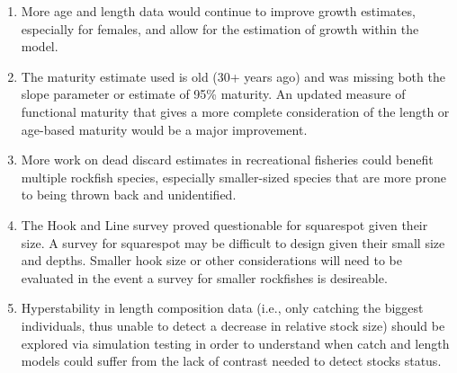 \documentclass[11pt,
  english,
  a4paper,
]{article}
\begin{document}
\begin{enumerate}
\def\labelenumi{\arabic{enumi}.}
\item

  More age and length data would continue to improve growth estimates, especially for females, and allow for the estimation of growth within the model.

  \tagmcend\tagstructend\tagstructend
\item

  The maturity estimate used is old (30+ years ago) and was missing both the slope parameter or estimate of 95\% maturity. An updated measure of functional maturity that gives a more complete consideration of the length or age-based maturity would be a major improvement.

  \tagmcend\tagstructend\tagstructend
\item

  More work on dead discard estimates in recreational fisheries could benefit multiple rockfish species, especially smaller-sized species that are more prone to being thrown back and unidentified.

  \tagmcend\tagstructend\tagstructend
\item

  The Hook and Line survey proved questionable for squarespot given their size. A survey for squarespot may be difficult to design given their small size and depths. Smaller hook size or other considerations will need to be evaluated in the event a survey for smaller rockfishes is desireable.

  \tagmcend\tagstructend\tagstructend
\item

  Hyperstability in length composition data (i.e., only catching the biggest individuals, thus unable to detect a decrease in relative stock size) should be explored via simulation testing in order to understand when catch and length models could suffer from the lack of contrast needed to detect stocks status.

  \tagmcend\tagstructend\tagstructend
\end{enumerate}

\tagstructend
\end{document}

